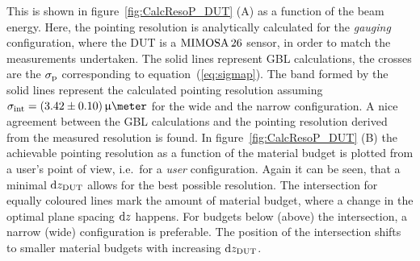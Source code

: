 \noindent
This is shown in figure~\ref{fig:CalcResoP_DUT} (A) as a function of the beam energy. 
Here, the pointing resolution is analytically calculated for the \textit{gauging} configuration, where the DUT is a $\textrm{MIMOSA\,26}$ sensor, in order to match the measurements undertaken. 
The solid lines represent GBL calculations, the crosses are the $\sigma_{\textrm{p}}$ corresponding to equation~(\ref{eq:sigmap}). 
The band formed by the solid lines represent the calculated pointing resolution assuming $\sigmai = (3.42 \pm 0.10)\,\upmu\meter$ for the wide and the narrow configuration. 
A nice agreement between the GBL calculations and the pointing resolution derived from the measured resolution is found.
In figure~\ref{fig:CalcResoP_DUT} (B) the achievable pointing resolution as a function of the material budget is plotted from a user's point of view, i.e.~for a \textit{user} configuration. 
Again it can be seen, that a minimal $\textrm{d}z_{\textrm{DUT}}$ allows for the best possible resolution. 
The intersection for equally coloured lines mark the amount of material budget, where a change in the optimal plane spacing $\textrm{d}z$ happens.
For budgets below (above) the intersection, a narrow (wide) configuration is preferable. 
The position of the intersection shifts to smaller material budgets with increasing $\textrm{d}z_{\textrm{DUT}}$. 

